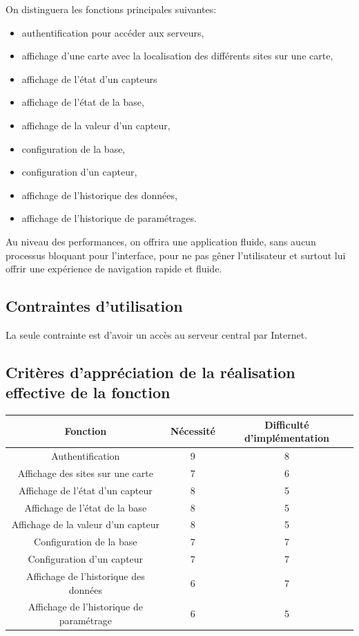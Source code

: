 On distinguera les fonctions principales suivantes:

\begin{itemize}
	\item authentification pour accéder aux serveurs,
	\item affichage d'une carte avec la localisation des différents sites sur une carte,
	\item affichage de l'état d'un capteurs
	\item affichage de l'état de la base,
	\item affichage de la valeur d'un capteur,
	\item configuration de la base,
	\item configuration d'un capteur,
	\item affichage de l'historique des données,
	\item affichage de l'historique de paramétrages.\\
\end{itemize}

Au niveau des performances, on offrira une application fluide, sans aucun processus bloquant pour l'interface, pour ne pas gêner l'utilisateur et surtout lui offrir une expérience de navigation rapide et fluide.

\subsection{Contraintes d'utilisation}

La seule contrainte est d'avoir un accès au serveur central par Internet.

\subsection{Critères d'appréciation de la réalisation effective de la fonction}

\begin{tabular}{|c|c|c|}
	\hline Fonction & Nécessité & Difficulté d'implémentation\\
	\hline 
	 Authentification & 9 & 8\\
	 Affichage des sites sur une carte & 7 & 6\\
	 Affichage de l'état d'un capteur & 8 & 5\\
	 Affichage de l'état de la base & 8 & 5\\
	 Affichage de la valeur d'un capteur & 8 & 5\\
	 Configuration de la base & 7 & 7\\
	 Configuration d'un capteur & 7 & 7\\
	 Affichage de l'historique des données & 6 & 7\\
	 Affichage de l'historique de paramétrage & 6 & 5\\
	\hline
\end{tabular}


